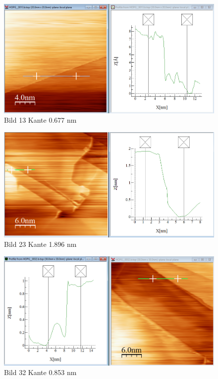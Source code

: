 \documentclass[10pt,a4paper]{article}
\begin{document}
\begin{figure}[]
	\includegraphics[scale = 0.2]{bild13.png}
	\centering
	\caption{Bild 13 Kante 0.677 nm}
	\label{b13}
\end{figure}

\begin{figure}[]
	\includegraphics[scale = 0.2]{bild23.png}
	\centering
	\caption{Bild 23 Kante 1.896 nm}
	\label{b23}
\end{figure}
\begin{figure}[]
	\includegraphics[scale = 0.2]{bild32.png}
	\centering
	\caption{Bild 32 Kante 0.853 nm}
	\label{b32}
\end{figure}
\end{document}
